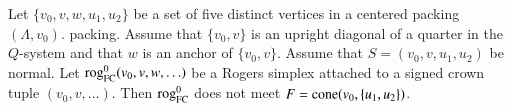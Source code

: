 %
%



\begin{lemma}
Let $\{v_0,v,w,u_1,u_2\}$ be a set of five distinct vertices in a
centered packing $(\Lambda,v_0)$.
packing.  Assume that $\{v_0,v\}$ is an upright diagonal of a quarter
in the $Q$-system and that $w$ is an anchor of $\{v_0,v\}$.
Assume that $S=(v_0,v,u_1,u_2)$ be normal.
Let ${\operatorname{rog}}^0_{\text{FC}}(v_0,v,w,\ldots)$ be 
a Rogers simplex attached to a signed crown tuple $(v_0,v,\ldots)$.
Then ${\operatorname{rog}}^0_{\text{FC}}$ does not meet $F={\operatorname{cone}}(v_0,\{u_1,u_2\})$.
\end{lemma}



